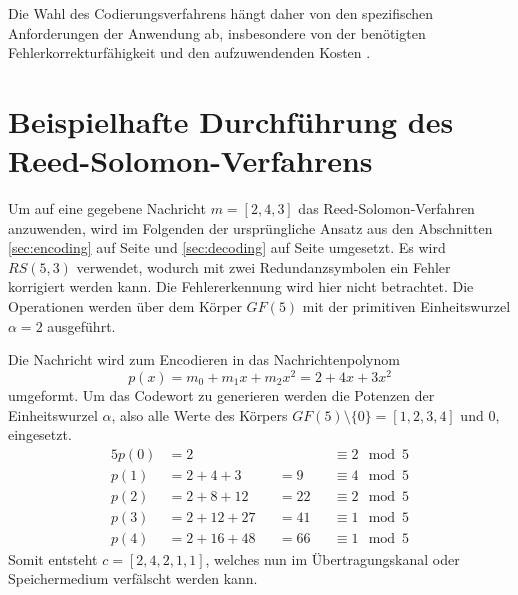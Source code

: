 Die Wahl des Codierungsverfahrens hängt daher von den spezifischen Anforderungen der Anwendung ab, insbesondere von der benötigten Fehlerkorrekturfähigkeit und den aufzuwendenden Kosten \cite{abrhaComparisonHammingBCH2019}.

\section{Beispielhafte Durchführung des Reed-Solomon-Verfahrens}\label{app:example}

Um auf eine gegebene Nachricht $m=[2,4,3]$ das Reed-Solomon-Verfahren anzuwenden, wird im Folgenden der ursprüngliche Ansatz aus den Abschnitten \ref{sec:encoding} auf Seite \pageref{sec:encoding} und \ref{sec:decoding} auf Seite \pageref{sec:decoding} umgesetzt.
Es wird $RS(5, 3)$ verwendet, wodurch mit zwei Redundanzsymbolen ein Fehler korrigiert werden kann.
Die Fehlererkennung wird hier nicht betrachtet.
Die Operationen werden über dem Körper $GF(5)$ mit der primitiven Einheitswurzel $\alpha=2$ ausgeführt.

Die Nachricht wird zum Encodieren in das Nachrichtenpolynom \[p(x)=m_0+m_1x+m_2x^2=2+4x+3x^2\] umgeformt.
Um das Codewort zu generieren werden die Potenzen der Einheitswurzel $\alpha$, also alle Werte des Körpers $GF(5)\setminus\{0\}=[1,2,3,4]$ und 0, eingesetzt.
\begin{alignat}{5}
p(0)&=2      &&    &&\equiv2\mod5 \nonumber\\
p(1)&=2+4+3  &&=9  &&\equiv4\mod5 \nonumber\\
p(2)&=2+8+12 &&=22 &&\equiv2\mod5 \nonumber\\
p(3)&=2+12+27&&=41 &&\equiv1\mod5 \nonumber\\
p(4)&=2+16+48&&=66 &&\equiv1\mod5 \nonumber
\end{alignat}
Somit entsteht $c=[2,4,2,1,1]$, welches nun im Übertragungskanal oder Speichermedium verfälscht werden kann.

